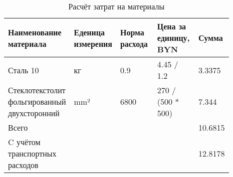 \begin{table}[H]
  \small
  \caption{Расчёт затрат на материалы}
  \begin{tabular}{|p{0.2\linewidth} | p{0.2\linewidth}| p{0.2\linewidth} |p{0.2\linewidth}| p{0.09\linewidth} |}
    \hline
Наименование материала & Еденица измерения & Норма расхода & Цена за единицу, BYN & Сумма\\[0pt]
\hline
    Сталь 10 & кг & 0.9 & 4.45 / 1.2 & 3.3375\\[0pt]
    \hline
    Стеклотекстолит фольгированный двухсторонний & mm² & 6800 & 270 / (500 * 500) & 7.344\\[0pt]
    \hline
    Всего &  &  &  & 10.6815 \\[0pt]
    \hline
    C учётом транспортных расходов &  &  &  & 12.8178 \\[0pt]
    \hline
\end{tabular}
\end{table}

